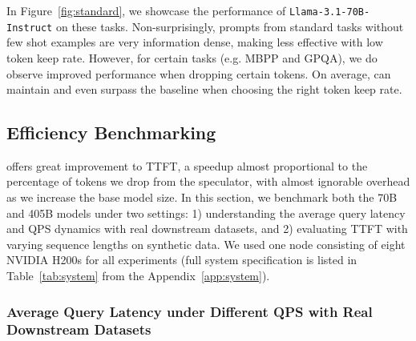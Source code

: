 In Figure~\ref{fig:standard}, we showcase the performance of \texttt{Llama-3.1-70B-Instruct} on these tasks. Non-surprisingly, prompts from standard tasks without few shot examples are very information dense, making \ours{} less effective with low token keep rate. However, for certain tasks (e.g. MBPP and GPQA), we do observe improved performance when dropping certain tokens. On average, \ours{} can maintain and even surpass the baseline when choosing the right token keep rate. 

\subsection{Efficiency Benchmarking}
\label{sec:efficiency}

\ours{} offers great improvement to TTFT, a speedup almost proportional to the percentage of tokens we drop from the speculator, with almost ignorable overhead as we increase the base model size. In this section, we benchmark both the 70B and 405B models under two settings: 1) understanding the average query latency and QPS dynamics with real downstream datasets, and 2) evaluating TTFT with varying sequence lengths on synthetic data. We used one node consisting of eight NVIDIA H200s for all experiments (full system specification is listed in Table~\ref{tab:system} from the Appendix~\ref{app:system}). 

\subsubsection{Average Query Latency under Different QPS with Real Downstream Datasets} 

